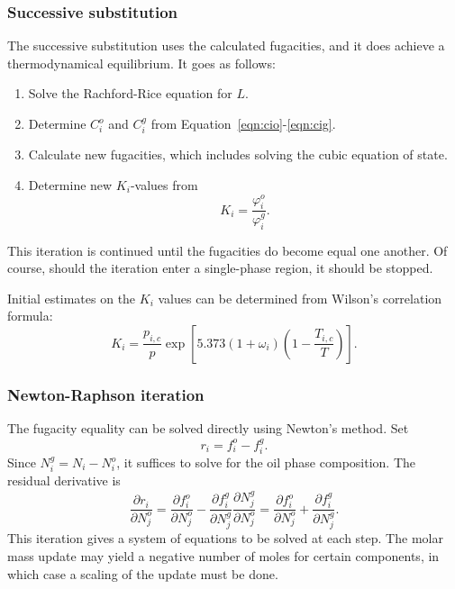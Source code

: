 \subsubsection{Successive substitution}

The successive substitution uses the calculated fugacities, and it does
achieve a thermodynamical equilibrium. It goes as follows:
\begin{enumerate}
\item Solve the Rachford-Rice equation for $L$.
\item Determine $C_i^o$ and $C_i^g$ from
  Equation~\eqref{eqn:cio}-\eqref{eqn:cig}.
\item Calculate new fugacities, which includes solving the cubic
  equation of state.
\item Determine new $K_i$-values from
  \begin{equation}
    K_i = \frac{\varphi_i^o}{\varphi_i^g}.
  \end{equation}
\end{enumerate}
This iteration is continued until the fugacities do become equal one
another. Of course, should the iteration enter a single-phase region,
it should be stopped.

Initial estimates on the $K_i$ values can be determined from Wilson's
correlation formula:
\begin{equation}
  K_i = \frac{p_{i,c}}{p}\exp\left[
    5.373 (1+\omega_i) \left(
      1-\frac{T_{i,c}}{T}
    \right)
  \right].
\end{equation}


\subsubsection{Newton-Raphson iteration}

The fugacity equality can be solved directly using Newton's
method. Set
\begin{equation}
  r_i = f_i^o - f_i^g.
\end{equation}
Since $N_i^g=N_i-N_i^o$, it suffices to solve for the oil phase
composition. The residual derivative is
\begin{equation}
  \frac{\partial r_i}{\partial N_j^o} =
  \frac{\partial f_i^o}{\partial N_j^o} -
  \frac{\partial f_i^g}{\partial N_j^g}
  \frac{\partial N_j^g}{\partial N_j^o} =
  \frac{\partial f_i^o}{\partial N_j^o} +
  \frac{\partial f_i^g}{\partial N_j^g}.
\end{equation}
This iteration gives a system of equations to be solved at each step.
The molar mass update may yield a negative number of moles for certain
components, in which case a scaling of the update must be done.

